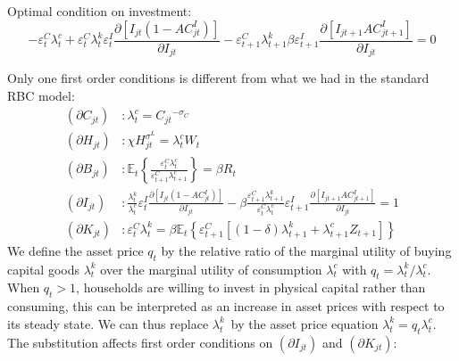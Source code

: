 \documentclass{article}%
\begin{document}
Optimal condition on investment:
\[
-\varepsilon_{t}^{C}\lambda_{t}^{c}+\varepsilon_{t}^{C}\lambda_{t}%
^{k}\varepsilon_{t}^{I}\frac{\partial\left[  I_{jt}\left(  1-AC_{jt}%
^{I}\right)  \right]  }{\partial I_{jt}}-\varepsilon_{t+1}^{C}\lambda
_{t+1}^{k}\beta\varepsilon_{t+1}^{I}\frac{\partial\left[  I_{jt+1}%
AC_{jt+1}^{I}\right]  }{\partial I_{jt}}=0
\]


Only one first order conditions is different from what we had in the standard
RBC model:%
\begin{align*}
\left(  \partial C_{jt}\right)   &  :\lambda_{t}^{c}=C_{jt}{}^{-\sigma_{C}}\\
\left(  \partial H_{jt}\right)   &  :\chi H_{jt}^{\sigma^{L}}=\lambda_{t}%
^{c}W_{t}\\
\left(  \partial B_{jt}\right)   &  :\mathbb{E}_{t}\left\{  \frac
{\varepsilon_{t}^{C}\lambda_{t}^{c}}{\varepsilon_{t+1}^{C}\lambda_{t+1}^{c}%
}\right\}  =\beta R_{t}\\
\left(  \partial I_{jt}\right)   &  :\frac{\lambda_{t}^{k}}{\lambda_{t}^{c}%
}\varepsilon_{t}^{I}\frac{\partial\left[  I_{jt}\left(  1-AC_{jt}^{I}\right)
\right]  }{\partial I_{jt}}-\beta\frac{\varepsilon_{t+1}^{C}\lambda_{t+1}^{k}%
}{\varepsilon_{t}^{C}\lambda_{t}^{c}}\varepsilon_{t+1}^{I}\frac{\partial
\left[  I_{jt+1}AC_{jt+1}^{I}\right]  }{\partial I_{jt}}=1\\
\left(  \partial K_{jt}\right)   &  :\varepsilon_{t}^{C}\lambda_{t}^{k}%
=\beta\mathbb{E}_{t}\left\{  \varepsilon_{t+1}^{C}\left[  \overset{}{\left(
1-\delta\right)  }\lambda_{t+1}^{k}+\lambda_{t+1}^{c}Z_{t+1}\right]  \right\}
\end{align*}
We define the asset price $q_{t}$ by the relative ratio of the marginal
utility of buying capital goods $\lambda_{t}^{k}$ over the marginal utility of
consumption $\lambda_{t}^{c}$ with $q_{t}=\lambda_{t}^{k}/\lambda_{t}^{c}$.
When $q_{t}>1$, households are willing to invest in physical capital rather
than consuming, this can be interpreted as an increase in asset prices with
respect to its steady state. We can thus replace $\lambda_{t}^{k}$\ by the
asset price equation $\lambda_{t}^{k}=q_{t}\lambda_{t}^{c}$. The substitution
affects first order conditions on $\left(  \partial I_{jt}\right)  $ and
$\left(  \partial K_{jt}\right)  $:%
\end{document}
